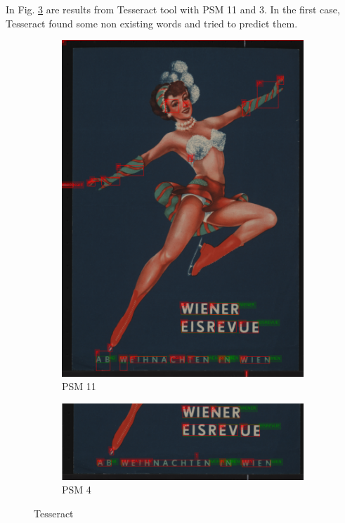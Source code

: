 In Fig. \ref{Im2:ex:tess} are results from Tesseract tool with PSM 11 and 3. In the first case, Tesseract found some non existing words and tried to predict them.
\begin{figure}[hbtp!]
    \begin{subfigure}{\textwidth}
        \centering
        \includegraphics[scale=0.36]{obrazky/plakaty/result_tesseract_vienna1_nosplit_psm11-21.png}
        \caption{PSM 11}
        \label{Im2:ex:tess11}
    \end{subfigure}

    \begin{subfigure}{\textwidth}
        \centering
        \includegraphics[scale=0.36]{obrazky/plakaty/result_tesseract_vienna1_split_psm4-21.png}
        \caption{PSM 4}
        \label{Im2:ex:tess4}
    \end{subfigure}
    \caption{Tesseract}
    \label{Im2:ex:tess}
\end{figure}


